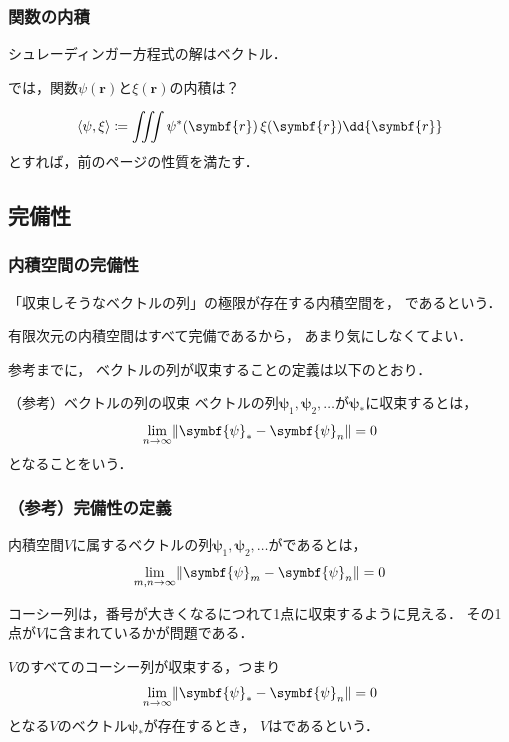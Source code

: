 \documentclass[
    10pt,
    ]{sotsu-beamer}
\begin{document}
\begin{frame}
    \frametitle{関数の内積}

    シュレーディンガー方程式の解はベクトル．

    では，関数$\psi(\symbf{r})$と$\xi(\symbf{r})$の内積は？

    \pause

    \begin{equation}
        \iparen{\psi, \xi}
            \coloneq \iiint \conj{\psi}(\symbf{r}) \, \xi(\symbf{r}) \dd{\symbf{r}}
    \end{equation}
    とすれば，前のページの性質を満たす．

\end{frame}


\subsection{完備性}


\begin{frame}
    \frametitle{内積空間の完備性}

    「収束しそうなベクトルの列」の極限が存在する内積空間を，
    であるという．

    \alert{有限次元の内積空間はすべて完備である}から，
    あまり気にしなくてよい．

    参考までに，
    ベクトルの列が収束することの定義は以下のとおり．
    \begin{block}{（参考）ベクトルの列の収束}
        ベクトルの列$\symbf{\psi}_1, \symbf{\psi}_2, \dotsc$が$\symbf{\psi}_*$に収束するとは，
        \begin{equation*}
            \lim_{n \to \infty} \norm{ \symbf{\psi}_* - \symbf{\psi}_n } = 0
        \end{equation*}
        となることをいう．
    \end{block}

\end{frame}


\begin{frame}
    \frametitle{（参考）完備性の定義}

    内積空間$V$に属するベクトルの列$\symbf{\psi}_1, \symbf{\psi}_2, \dotsc$がであるとは，
    \begin{equation*}
        \lim_{m, n \to \infty} \norm{\symbf{\psi}_m - \symbf{\psi}_n} = 0
    \end{equation*}

    コーシー列は，番号が大きくなるにつれて1点に収束するように見える．
    その1点が$V$に含まれているかが問題である．

    $V$のすべてのコーシー列が収束する，つまり
    \begin{equation*}
        \lim_{n \to \infty} \norm{ \symbf{\psi}_* - \symbf{\psi}_n } = 0
    \end{equation*}
    となる$V$のベクトル$\symbf{\psi}_*$が存在するとき，
    $V$はであるという．

\end{frame}
\end{document}
